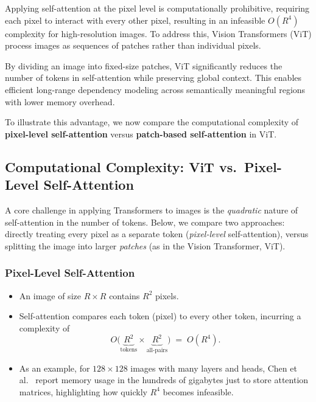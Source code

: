 \noindent
Applying self-attention at the pixel level is computationally prohibitive, requiring each pixel to interact with every other pixel, resulting in an infeasible \( O(R^4) \) complexity for high-resolution images. To address this, Vision Transformers (ViT) process images as sequences of patches rather than individual pixels.

\noindent
By dividing an image into fixed-size patches, ViT significantly reduces the number of tokens in self-attention while preserving global context. This enables efficient long-range dependency modeling across semantically meaningful regions with lower memory overhead.

\noindent
To illustrate this advantage, we now compare the computational complexity of \textbf{pixel-level self-attention} versus \textbf{patch-based self-attention} in ViT.

\newpage
\subsection{Computational Complexity: ViT vs.\ Pixel-Level Self-Attention}
\label{sec:chapter18_vit_vs_pixels}

A core challenge in applying Transformers to images is the \emph{quadratic} nature of self-attention in the number of tokens. Below, we compare two approaches: directly treating every pixel as a separate token (\emph{pixel-level} self-attention), versus splitting the image into larger \emph{patches} (as in the Vision Transformer, ViT).

\subsubsection{Pixel-Level Self-Attention}
\begin{itemize}
    \item An image of size \(R \times R\) contains \(R^2\) pixels.  
    \item Self-attention compares each token (pixel) to every other token, incurring a complexity of
    \[
    O\bigl(\underbrace{R^2}_{\text{tokens}} \times \underbrace{R^2}_{\text{all-pairs}}\bigr) \;=\; O(R^4).
    \]
    \item As an example, for \(128 \times 128\) images with many layers and heads, Chen et al.\ \cite{chen2020_gpt_pixels} report memory usage in the hundreds of gigabytes just to store attention matrices, highlighting how quickly \(R^4\) becomes infeasible.
\end{itemize}

